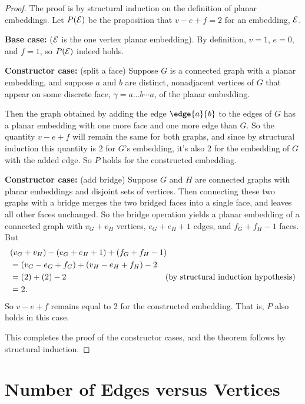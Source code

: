 \begin{proof}
The proof is by structural induction on the definition of planar
embeddings.  Let $P(\mathcal{E})$ be the proposition that $v - e + f = 2$ for an
embedding, $\mathcal{E}$.

\textbf{Base case:} ($\mathcal{E}$ is the one vertex planar embedding).
By definition, $v=1$, $e=0$, and $f=1$, so $P(\mathcal{E})$ indeed holds.

\textbf{Constructor case:} (split a face) Suppose $G$ is a connected graph
with a planar embedding, and suppose $a$ and $b$ are distinct, nonadjacent
vertices of $G$ that appear on some discrete face,
$\gamma= a \dots b \cdots a$, of the planar embedding.

Then the graph obtained by adding the edge $\edge{a}{b}$ to the edges of
$G$ has a planar embedding with one more face and one more edge than $G$.
So the quantity $v-e+f$ will remain the same for both graphs, and since by
structural induction this quantity is 2 for $G$'s embedding, it's also 2
for the embedding of $G$ with the added edge.  So $P$ holds for the
constructed embedding.

\textbf{Constructor case:} (add bridge) Suppose $G$ and $H$ are connected
graphs with planar embeddings and disjoint sets of vertices.  Then
connecting these two graphs with a bridge merges the two bridged faces
into a single face, and leaves all other faces unchanged.  So the bridge
operation yields a planar embedding of a connected graph with $v_G +v_H$
vertices, $e_G + e_H +1$ edges, and $f_G + f_H - 1$ faces.  But
\begin{align*}
\lefteqn{(v_G +v_H) - (e_G + e_H +1) + (f_G + f_H - 1)}\\
   & = (v_G  - e_G + f_G) + (v_H  - e_H  + f_H) -2\\
   & = (2)+(2)-2 & \text{(by structural induction hypothesis)}\\
   & = 2.
\end{align*}
So $v-e+f$ remains equal to 2 for the constructed embedding.  That is, $P$
also holds in this case.

This completes the proof of the constructor cases, and the theorem follows
by structural induction.
\end{proof}

\iffalse
\mfigure{!}{1in}{planar-assumptions.pdf}
\fi

\section{Number of Edges versus Vertices}


